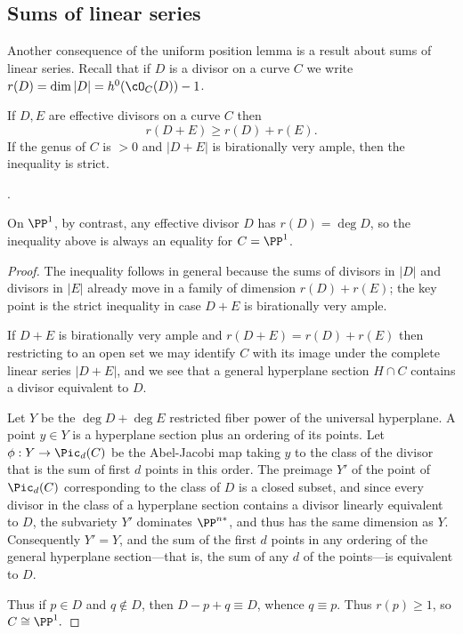 \subsection{Sums of linear series}

Another consequence of the uniform position lemma is a result about sums of linear series.
Recall that if $D$ is a divisor on a curve $C$ we write $r(D) = \dim |D| = h^0(\cO_C(D))-1$.

\begin{corollary}\label{Clifford equality plus}
If $D,E$ are effective divisors on a curve $C$ then
$$
r(D+E) \geq r(D)+r(E).
$$
If the genus of $C$ is $>0$ and $|D+E|$ is birationally very ample, then the inequality is strict.
\end{corollary}.

On $\PP^1$, by contrast, any effective divisor $D$ has $r(D) = \deg D$, so the inequality above is
always an equality for $C = \PP^1$.

\begin{proof}
 The inequality follows in general because the sums of divisors in $|D|$ and divisors in $|E|$ already move in 
 a family of dimension $r(D)+r(E)$; the key point is the strict inequality in case $D+E$ is birationally very ample.
 
If $D+E$ is birationally very ample and $r(D+E) = r(D)+r(E)$ then restricting to an open set
we may identify $C$ with its image under the complete linear series $|D+E|$, and we see that a general hyperplane section $H\cap C$ contains a divisor equivalent to $D$.

Let $Y$ be the $\deg D +\deg E$ restricted fiber power of the universal hyperplane.
A point $y\in Y$ is a hyperplane section plus an ordering of its points.  Let $\phi: Y \to \Pic_d(C)$ be the Abel-Jacobi map taking $y$
 to the class of the divisor that is the sum of first $d$ points in this order. The preimage  $Y'$ of the point of $\Pic_d(C)$ corresponding to the class of $D$ is a closed subset, and
since every divisor in the class of a hyperplane section contains a divisor
linearly equivalent to  $D$, the subvariety $Y'$ dominates $\PP^{n*}$, and thus
has the same dimension as $Y$. Consequently $Y'=Y$, and the sum of the first $d$ points
in any ordering of the general hyperplane section---that is, the sum of any $d$
of the points---is equivalent to $D$.

Thus if $p\in D$ and $q\notin D$, then $D-p+q \equiv D$, whence $q\equiv p$. Thus
$r(p)\geq 1$, so $C\cong \PP^1.$
\end{proof}

